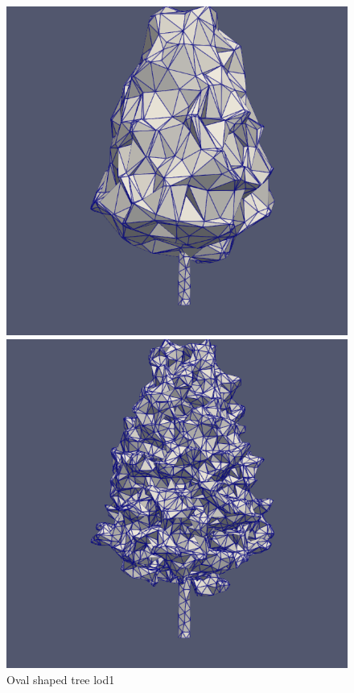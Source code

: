 \documentclass[12pt]{article}
\begin{document}
\begin{figure}[H]
    \centering
    \begin{minipage}{0.30\textwidth}
        \centering
        \includegraphics[width=1\textwidth]{images/tree-oval_lod1.png}
        \caption{Oval shaped tree lod1}
    \end{minipage}
    \begin{minipage}{0.30\textwidth}
        \centering
        \includegraphics[width=1\textwidth]{images/tree-oval_lod2.png}

\end{minipage}
\end{figure}
\end{document}
